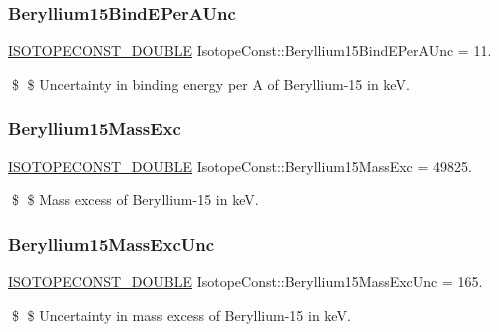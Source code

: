 \subsubsection{\texorpdfstring{Beryllium15\+Bind\+E\+Per\+A\+Unc}{Beryllium15BindEPerAUnc}}
{\footnotesize\ttfamily \mbox{\hyperlink{group___isotope_const-_macros_ga8f45a7272ce02c0b4c65c44636ed719a}{I\+S\+O\+T\+O\+P\+E\+C\+O\+N\+S\+T\+\_\+\+D\+O\+U\+B\+LE}} Isotope\+Const\+::\+Beryllium15\+Bind\+E\+Per\+A\+Unc = 11.}

\$ \$ Uncertainty in binding energy per A of Beryllium-\/15 in keV. \mbox{\label{group___isotope_const-_beryllium-_be15_ga628077eef6088a071adda57e8fd1081f}} 
\subsubsection{\texorpdfstring{Beryllium15\+Mass\+Exc}{Beryllium15MassExc}}
{\footnotesize\ttfamily \mbox{\hyperlink{group___isotope_const-_macros_ga8f45a7272ce02c0b4c65c44636ed719a}{I\+S\+O\+T\+O\+P\+E\+C\+O\+N\+S\+T\+\_\+\+D\+O\+U\+B\+LE}} Isotope\+Const\+::\+Beryllium15\+Mass\+Exc = 49825.}

\$ \$ Mass excess of Beryllium-\/15 in keV. \mbox{\label{group___isotope_const-_beryllium-_be15_ga3bc043eafafe12fd75c0561aeb61da6d}} 
\subsubsection{\texorpdfstring{Beryllium15\+Mass\+Exc\+Unc}{Beryllium15MassExcUnc}}
{\footnotesize\ttfamily \mbox{\hyperlink{group___isotope_const-_macros_ga8f45a7272ce02c0b4c65c44636ed719a}{I\+S\+O\+T\+O\+P\+E\+C\+O\+N\+S\+T\+\_\+\+D\+O\+U\+B\+LE}} Isotope\+Const\+::\+Beryllium15\+Mass\+Exc\+Unc = 165.}

\$ \$ Uncertainty in mass excess of Beryllium-\/15 in keV. \mbox{\label{group___isotope_const-_beryllium-_be15_ga1533d6149188ed36e13603113fab02f1}} 
